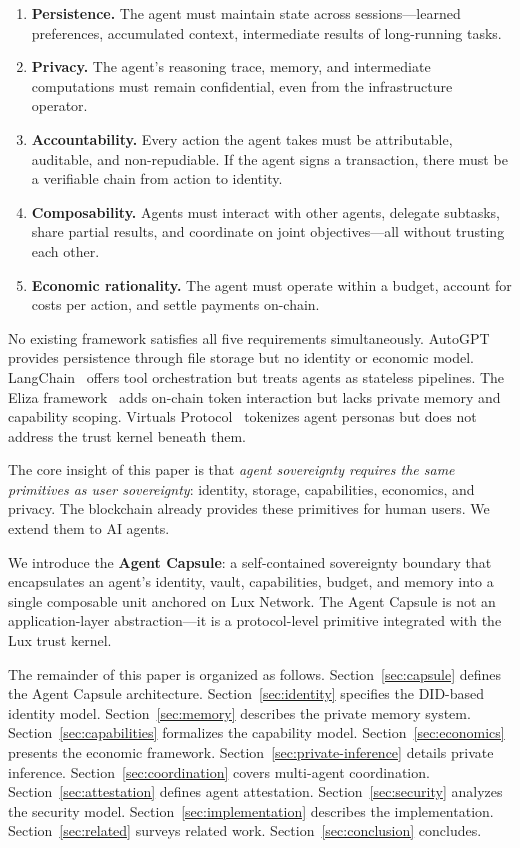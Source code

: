 \documentclass[11pt,a4paper]{article}
\begin{document}
\begin{enumerate}[label=(\roman*)]
    \item \textbf{Persistence.} The agent must maintain state across sessions---learned preferences, accumulated context, intermediate results of long-running tasks.
    \item \textbf{Privacy.} The agent's reasoning trace, memory, and intermediate computations must remain confidential, even from the infrastructure operator.
    \item \textbf{Accountability.} Every action the agent takes must be attributable, auditable, and non-repudiable. If the agent signs a transaction, there must be a verifiable chain from action to identity.
    \item \textbf{Composability.} Agents must interact with other agents, delegate subtasks, share partial results, and coordinate on joint objectives---all without trusting each other.
    \item \textbf{Economic rationality.} The agent must operate within a budget, account for costs per action, and settle payments on-chain.
\end{enumerate}

No existing framework satisfies all five requirements simultaneously. AutoGPT~\cite{autogpt2023} provides persistence through file storage but no identity or economic model. LangChain~\cite{langchain2023} offers tool orchestration but treats agents as stateless pipelines. The Eliza framework~\cite{ai16z2024eliza} adds on-chain token interaction but lacks private memory and capability scoping. Virtuals Protocol~\cite{virtuals2024} tokenizes agent personas but does not address the trust kernel beneath them.

The core insight of this paper is that \emph{agent sovereignty requires the same primitives as user sovereignty}: identity, storage, capabilities, economics, and privacy. The blockchain already provides these primitives for human users. We extend them to AI agents.

We introduce the \textbf{Agent Capsule}: a self-contained sovereignty boundary that encapsulates an agent's identity, vault, capabilities, budget, and memory into a single composable unit anchored on Lux Network. The Agent Capsule is not an application-layer abstraction---it is a protocol-level primitive integrated with the Lux trust kernel.

The remainder of this paper is organized as follows. Section~\ref{sec:capsule} defines the Agent Capsule architecture. Section~\ref{sec:identity} specifies the DID-based identity model. Section~\ref{sec:memory} describes the private memory system. Section~\ref{sec:capabilities} formalizes the capability model. Section~\ref{sec:economics} presents the economic framework. Section~\ref{sec:private-inference} details private inference. Section~\ref{sec:coordination} covers multi-agent coordination. Section~\ref{sec:attestation} defines agent attestation. Section~\ref{sec:security} analyzes the security model. Section~\ref{sec:implementation} describes the implementation. Section~\ref{sec:related} surveys related work. Section~\ref{sec:conclusion} concludes.
\end{document}
